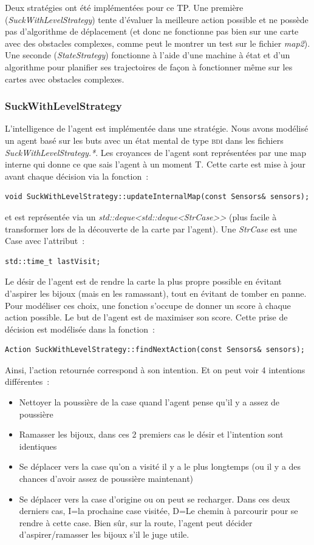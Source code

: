 \documentclass{article}
\begin{document}
Deux stratégies ont été implémentées pour ce TP. Une première
(\emph{SuckWithLevelStrategy}) tente d'évaluer la meilleure action possible et
ne possède pas d'algorithme de déplacement (et donc ne fonctionne pas bien sur
une carte avec des obstacles complexes, comme peut le montrer un test sur le
fichier \emph{map2}). Une seconde (\emph{StateStrategy}) fonctionne à l'aide
d'une machine à état et d'un algorithme pour planifier ses trajectoires de
façon à fonctionner même sur les cartes avec obstacles complexes.

\subsubsection{SuckWithLevelStrategy}

L'intelligence de l'agent est implémentée dans une stratégie. Nous avons modélisé un agent basé sur les buts avec un état mental de type \textsc{bdi} dans les fichiers \emph{SuckWithLevelStrategy.*}. Les croyances de l'agent sont représentées par une map interne qui donne ce que sais l'agent à un moment T. Cette carte est mise à jour avant chaque décision via la fonction~:
\begin{verbatim}
void SuckWithLevelStrategy::updateInternalMap(const Sensors& sensors);
\end{verbatim}
et est représentée via un \emph{std::deque<std::deque<StrCase>>} (plus facile à transformer lors de la découverte de la carte par l'agent). Une \emph{StrCase} est une Case avec l'attribut~:
\begin{verbatim}
std::time_t lastVisit;
\end{verbatim}

Le désir de l'agent est de rendre la carte la plus propre possible en évitant d'aspirer les bijoux (mais en les ramassant), tout en évitant de tomber en panne. Pour modéliser ces choix, une fonction s'occupe de donner un score à chaque action possible. Le but de l'agent est de maximiser son score. Cette prise de décision est modélisée dans la fonction~:
\begin{verbatim}
Action SuckWithLevelStrategy::findNextAction(const Sensors& sensors);
\end{verbatim}
Ainsi, l'action retournée correspond à son intention. Et on peut voir 4 intentions différentes~:
\begin{itemize}
    \item Nettoyer la poussière de la case quand l'agent pense qu'il y a assez de poussière
    \item Ramasser les bijoux, dans ces 2 premiers cas le désir et l'intention sont identiques
    \item Se déplacer vers la case qu'on a visité il y a le plus longtemps (ou il y a des chances d'avoir assez de poussière maintenant)
    \item Se déplacer vers la case d'origine ou on peut se recharger. Dans ces deux derniers cas, I=la prochaine case visitée, D=Le chemin à parcourir pour se rendre à cette case. Bien sûr, sur la route, l'agent peut décider d'aspirer/ramasser les bijoux s'il le juge utile.
\end{itemize}
\end{document}
